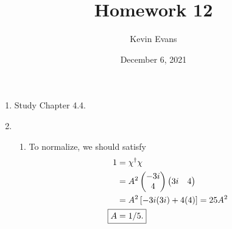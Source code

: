 \documentclass{homework}
\title{Homework 12}
\author{Kevin Evans}
\date{December 6, 2021}
\begin{document}
	\maketitle
	\begin{enumerate}
		\item Study Chapter 4.4.
		\item %
			\begin{enumerate}
				\item 			To normalize, we should satisfy \begin{align*}
					1 & = \chi^\dagger \chi \\
					& = A^2 \begin{pmatrix}
						-3i \\ 4
					\end{pmatrix} \begin{pmatrix}
						3i & 4
					\end{pmatrix} \\
					& = A^2 \left[
					-3i(3i)
					+ 4(4)
					\right] = 25 A^2\\
					\Aboxed{ A & = 1/5. }
				\end{align*}
			

\end{enumerate}
\end{enumerate}
\end{document}
